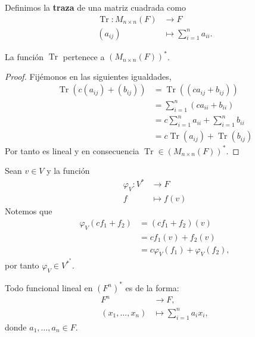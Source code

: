 \documentclass[12pt,a4paper]{book}
\renewcommand{\Tr}{\operatorname{Tr}}
\begin{document}
    \begin{definicion}[Traza]
    \label{def:28}
        Definimos la \textbf{traza} de una matriz cuadrada como
        \begin{align*}
            \Tr: M_{n \times n}(F) & \to F\\
            (a_{ij}) & \mapsto \sum_{i = 1}^{n}a_{ii}.
        \end{align*}
    \end{definicion}

    \begin{proposicion}
    \label{prop:34}
        La función $\Tr$ pertenece a $(M_{n \times n}(F))^{*}$.
    \end{proposicion}

    \begin{proof}
        Fijémonos en las siguientes igualdades,
        \begin{align*}
            \Tr(c(a_{ij}) + (b_{ij})) & = \Tr((ca_{ij} + b_{ij}))\\
            & = \sum_{i = 1}^{n}(ca_{ii} + b_{ii})\\
            & = c\sum_{i = 1}^{n} a_{ii} + \sum_{i = 1}^{n}b_{ii}\\
            & = c \Tr(a_{ij}) + \Tr(b_{ij})
        \end{align*}
        Por tanto es lineal y en consecuencia $\Tr \in (M_{n \times n}(F))^{*}$.
    \end{proof}

    \begin{ejemplo}
    \label{ej:39}
        Sean $v \in V$ y la función
        \begin{align*}
            \varphi_{V}: V^{*} & \longrightarrow F\\
            f & \longmapsto f(v)
        \end{align*}
        Notemos que
        \begin{align*}
            \varphi_{V}(cf_{1} + f_{2}) & = (cf_{1} + f_{2})(v)\\
            & = cf_{1}(v) + f_{2}(v)\\
            & = c\varphi_{V}(f_{1}) + \varphi_{V}(f_{2}),
        \end{align*}
        por tanto $\varphi_{V} \in V^{*^{*}}$.
    \end{ejemplo}

    \begin{proposicion}
    \label{prop:35}
        Todo funcional lineal en $(F^{n})^{\ast}$ es de la forma:
        \begin{align*}
            F^{n} & \to F,\\
            (x_{1}, \dots, x_{n}) & \mapsto \sum_{i = 1}^{n}a_{i}x_{i},
        \end{align*}
        donde $a_{1}, \dots, a_{n} \in F$.
    \end{proposicion}
\end{document}
